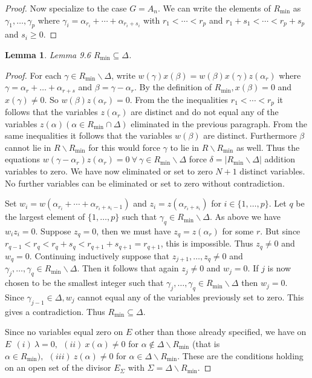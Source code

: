 \documentclass{memo-l}
\newtheorem{lemma}[theorem]{Lemma}
\theoremstyle{definition}
\theoremstyle{remark}
\numberwithin{section}{chapter}
\numberwithin{equation}{chapter}
\begin{document}
\begin{proof}
   Now specialize to the case $G = A_{n}$. 
 We can write the elements of $R_{\min}$ as ${\gamma}_1,
\ldots ,{\gamma}_p$  where ${\gamma}_i  
= {\alpha}_{r_{i}} +\cdots + {\alpha}_{r_{i}+s_{i}}$  with $r_{1} < \cdots < 
r_{p}$ and $r_{1}+s_{1}< \cdots < r_{p}+s_{p}$ and $s_{i} \ge 0$. 
\end{proof}
 
\begin{lemma}{Lemma  9.6}   $R_{\min} {\subseteq} {\Delta}$.
\end{lemma}

\begin{proof}    For each ${\gamma} \in R_{\min}\backslash {\Delta}$, 
write $w({\gamma})x({\beta})=w({\beta})x({\gamma})z({\alpha}_{r})$ where 
${\gamma} = {\alpha}_{r} + \ldots + {\alpha}_{r+s}$ and ${\beta} = 
{\gamma}-{\alpha}_{r}$. 
 By the definition of $R_{\min}, x({\beta}) = 0$ and $x({\gamma}) \ne 0$. 
 So $w({\beta})z({\alpha}_{r}) = 0$. 
 From the the inequalities $r_{1} < \cdots < r_{p}$ it follows that the 
variables $z({\alpha}_{r})$ are distinct and do not equal any of the variables 
$z({\alpha}) ({\alpha} \in R_{\min} {\cap} {\Delta})$ eliminated in the 
previous paragraph. 
 From the same inequalities it follows that the variables $w({\beta})$ are 
distinct. 
 Furthermore ${\beta}$ cannot lie in $R\backslash R_{\min}$ for this would 
force ${\gamma}$ to lie in $R\backslash R_{\min}$ as well. 
 Thus the equations $w({\gamma}-{\alpha}_{r})z({\alpha}_{r}) = 
0 {\ \forall\ } {\gamma} \in R_{\min}\backslash {\Delta}$ force 
${\delta} = \vert R_{\min}\backslash {\Delta}\vert$  addition variables to zero. 
 We have now eliminated or set to zero $N+1$ distinct variables. 
 No further variables can be eliminated or set to zero without contradiction.

   Set $w_{i} = w({\alpha}_{r_{i}} + \cdots +{\alpha}_{r_{i}+s_{i}-1})$ and 
$z_{i} = z({\alpha}_{r_{i}+s_{i}})$ for $i \in \{1,\ldots ,p\}. $ 
Let $q$ be the largest element of $\{1,\ldots ,p\}$ such that 
${\gamma}_{q} \in R_{\min}\backslash {\Delta}$. 
 As above we have $w_{i}z_{i} = 0$. 
 Suppose $z_{q} = 0$, then we must have $z_{q} = z({\alpha}_{r})$ for some $r$. 
 But since $r_{q-1} < r_{q} < r_{q}+s_{q} < r_{q+1}+s_{q+1} = r_{q+1}$, this 
is impossible.  Thus $z_{q} \ne 0$ and $w_{q}=0$. 
 Continuing inductively suppose that $z_{j+1},\ldots ,z_{q} \ne  0$ and 
${\gamma}_{j},\ldots ,{\gamma}_{q} \in R_{\min}\backslash {\Delta}$. 
 Then it follows that again $z_{j} \ne 0$ and $w_{j} = 0$. 
 If $j$ is now chosen to be the smallest integer such that 
${\gamma}_{j},\ldots ,{\gamma}_{q} \in R_{\min}\backslash {\Delta}$ then 
$w_{j}=0 .$  Since ${\gamma}_{j-1} \in {\Delta}, w_{j}$ cannot equal any 
of the variables previously set to zero. 
 This gives a contradiction.  Thus $R_{\min} {\subseteq} {\Delta}$.

   Since no variables equal zero on $E$ other than those already specified, 
we have on $E \ \ (i) \ {\lambda}=0, \ \ (ii) \ x({\alpha})\ne 0$ for ${\alpha} \notin 
{\Delta}\backslash R_{\min}$ (that is ${\alpha} \in R_{\min}), 
\ \ (iii) \ z({\alpha})\ne 0$ for ${\alpha} \in {\Delta}\backslash R_{\min}$. 
 These are the conditions holding on an open set of the divisor $E_{{\Sigma}}$ 
with ${\Sigma} = {\Delta}\backslash R_{\min}$.
\end{proof}
\end{document}
